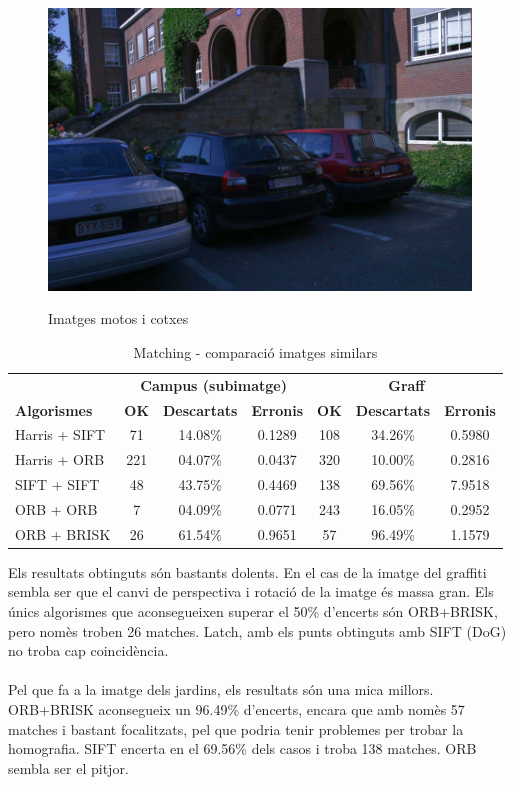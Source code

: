 \begin{figure}[!htb]
				\label{fig:awesome_image3}
			\endminipage\hfill
				\includegraphics[width=\linewidth]{images/experiments/cars6}
				\label{fig:awesome_image3}
			\endminipage
			\caption{Imatges motos i cotxes}
		\end{figure}

		\begin{table}[H]
			\begin{center}
				\begin{tabular}{l | c c c | c c c}
					& \multicolumn{3}{c|}{\textbf{Campus (subimatge)}} & \multicolumn{3}{c}{\textbf{Graff}} \\
					\textbf{Algorismes} & \textbf{OK} & \textbf{Descartats} & \textbf{Erronis} & \textbf{OK} & \textbf{Descartats} & \textbf{Erronis} \\ \hline
					Harris + SIFT & 71 & 14.08\% & 0.1289 & 108 & 34.26\% & 0.5980 \\
					Harris + ORB & 221 & 04.07\% & 0.0437 & 320 & 10.00\% & 0.2816 \\
					SIFT + SIFT & 48 & 43.75\% & 0.4469 & 138 & 69.56\% & 7.9518 \\
					ORB + ORB & 7 & 04.09\% & 0.0771 & 243 & 16.05\% & 0.2952 \\
					ORB + BRISK & 26 & 61.54\% & 0.9651 & 57 & 96.49\% & 1.1579 \\
				\end{tabular}
			\end{center}
			\caption{Matching - comparació imatges similars}
		\end{table}
		\noindent
		Els resultats obtinguts són bastants dolents. En el cas de la imatge del graffiti sembla ser que el canvi de perspectiva i rotació de la imatge és massa gran.
		Els únics algorismes que aconsegueixen superar el 50\% d'encerts són ORB+BRISK, pero nomès troben 26 matches. Latch, amb els punts obtinguts amb SIFT (DoG) no troba cap coincidència.\\\\
		Pel que fa a la imatge dels jardins, els resultats són una mica millors. ORB+BRISK aconsegueix un 96.49\% d'encerts, encara que amb nomès 57 matches i bastant focalitzats, pel que podria tenir
		problemes per trobar la homografia. SIFT encerta en el 69.56\% dels casos i troba 138 matches. ORB sembla ser el pitjor.\\

